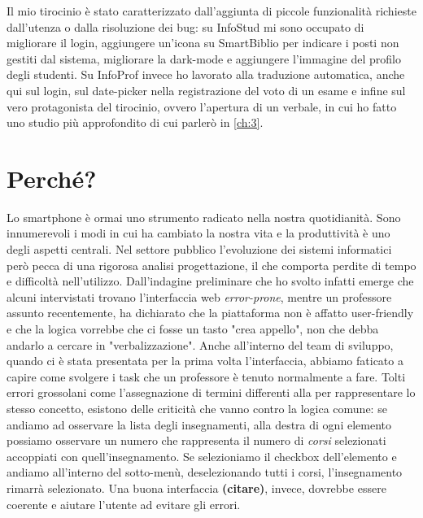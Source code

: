 \documentclass[Lau, oneside, noexaminfo]{sapthesis}%
\begin{document}
Il mio tirocinio è stato caratterizzato dall'aggiunta di piccole funzionalità richieste dall'utenza o dalla risoluzione dei bug: su InfoStud mi sono occupato di migliorare il login, aggiungere un'icona su SmartBiblio per indicare i posti non gestiti dal sistema, migliorare la dark-mode e aggiungere l'immagine del profilo degli studenti. Su InfoProf invece ho lavorato alla traduzione automatica, anche qui sul login, sul date-picker nella registrazione del voto di un esame e infine sul vero protagonista del tirocinio, ovvero l'apertura di un verbale, in cui ho fatto uno studio più approfondito di cui parlerò in \ref{ch:3}.

\section{Perché?}
\label{sec:why}
Lo smartphone è ormai uno strumento radicato nella nostra quotidianità. Sono innumerevoli i modi in cui ha cambiato la nostra vita e la produttività è uno degli aspetti centrali. Nel settore pubblico l'evoluzione dei sistemi informatici però pecca di una rigorosa analisi progettazione, il che comporta perdite di tempo e difficoltà nell'utilizzo. Dall'indagine preliminare che ho svolto infatti emerge che alcuni intervistati trovano l'interfaccia web \textit{error-prone}, mentre un professore assunto recentemente, ha dichiarato che la piattaforma non è affatto user-friendly e che la logica vorrebbe che ci fosse un tasto "crea appello", non che debba andarlo a cercare in "verbalizzazione". Anche all'interno del team di sviluppo, quando ci è stata presentata per la prima volta l'interfaccia, abbiamo faticato a capire come svolgere i task che un professore è tenuto normalmente a fare. Tolti errori grossolani come l'assegnazione di termini differenti alla per rappresentare lo stesso concetto, esistono delle criticità che vanno contro la logica comune: se andiamo ad osservare la lista degli insegnamenti, alla destra di ogni elemento possiamo osservare un numero che rappresenta il numero di \textit{corsi} selezionati accoppiati con quell'insegnamento. Se selezioniamo il checkbox dell'elemento e andiamo all'interno del sotto-menù, deselezionando tutti i corsi, l'insegnamento rimarrà selezionato. Una buona interfaccia \textbf{(citare)}, invece, dovrebbe essere coerente e aiutare l'utente ad evitare gli errori.

\end{document}
